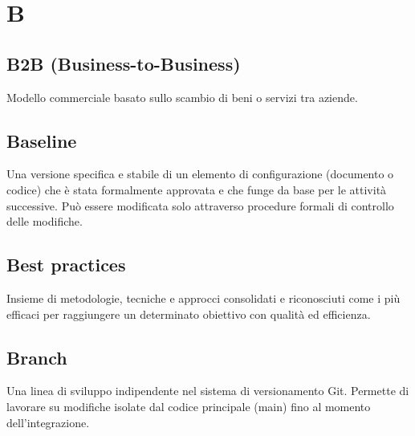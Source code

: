 \documentclass[a4paper, 11pt, oneside]{scrartcl} %
\begin{document}
\vspace{0.5cm}


\section*{B}


\subsection*{B2B (Business-to-Business)}
Modello commerciale basato sullo scambio di beni o servizi tra aziende.
\vspace{0.5cm}

\subsection*{Baseline}
Una versione specifica e stabile di un elemento di configurazione (documento o codice) che è stata formalmente approvata e che funge da base per le attività successive. Può essere modificata solo attraverso procedure formali di controllo delle modifiche.
\vspace{0.5cm}

\subsection*{Best practices}


Insieme di metodologie, tecniche e approcci consolidati e riconosciuti come i più efficaci per raggiungere un determinato obiettivo con qualità ed efficienza.

\vspace{0.5cm}

\subsection*{Branch}


Una linea di sviluppo indipendente nel sistema di versionamento Git. Permette di lavorare su modifiche isolate dal codice principale (main) fino al momento dell'integrazione.

\vspace{0.5cm}
\end{document}
